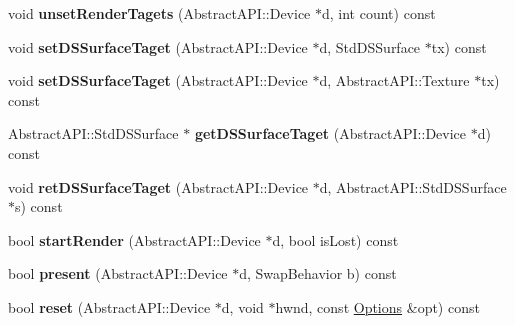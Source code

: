 \begin{DoxyCompactItemize}
\item 
\hypertarget{class_tempest_1_1_opengl2x_a54460147baab85a097a8fe25b6893e40}{void {\bfseries unset\+Render\+Tagets} (Abstract\+A\+P\+I\+::\+Device $\ast$d, int count) const }\label{class_tempest_1_1_opengl2x_a54460147baab85a097a8fe25b6893e40}

\item 
\hypertarget{class_tempest_1_1_opengl2x_a00e95c6c75325d059090ad6fe554dc33}{void {\bfseries set\+D\+S\+Surface\+Taget} (Abstract\+A\+P\+I\+::\+Device $\ast$d, Std\+D\+S\+Surface $\ast$tx) const }\label{class_tempest_1_1_opengl2x_a00e95c6c75325d059090ad6fe554dc33}

\item 
\hypertarget{class_tempest_1_1_opengl2x_a194641f39ced16715135bebfd8cc09fc}{void {\bfseries set\+D\+S\+Surface\+Taget} (Abstract\+A\+P\+I\+::\+Device $\ast$d, Abstract\+A\+P\+I\+::\+Texture $\ast$tx) const }\label{class_tempest_1_1_opengl2x_a194641f39ced16715135bebfd8cc09fc}

\item 
\hypertarget{class_tempest_1_1_opengl2x_a6597bfa5444a239c91764644276c92d8}{Abstract\+A\+P\+I\+::\+Std\+D\+S\+Surface $\ast$ {\bfseries get\+D\+S\+Surface\+Taget} (Abstract\+A\+P\+I\+::\+Device $\ast$d) const }\label{class_tempest_1_1_opengl2x_a6597bfa5444a239c91764644276c92d8}

\item 
\hypertarget{class_tempest_1_1_opengl2x_a5f664d2fe2ef10a548a70b38846e6723}{void {\bfseries ret\+D\+S\+Surface\+Taget} (Abstract\+A\+P\+I\+::\+Device $\ast$d, Abstract\+A\+P\+I\+::\+Std\+D\+S\+Surface $\ast$s) const }\label{class_tempest_1_1_opengl2x_a5f664d2fe2ef10a548a70b38846e6723}

\item 
\hypertarget{class_tempest_1_1_opengl2x_a1b1eda3a8f736df9f281170b6c280738}{bool {\bfseries start\+Render} (Abstract\+A\+P\+I\+::\+Device $\ast$d, bool is\+Lost) const }\label{class_tempest_1_1_opengl2x_a1b1eda3a8f736df9f281170b6c280738}

\item 
\hypertarget{class_tempest_1_1_opengl2x_a3fcfdbd327882af5d6c744307ea0465d}{bool {\bfseries present} (Abstract\+A\+P\+I\+::\+Device $\ast$d, Swap\+Behavior b) const }\label{class_tempest_1_1_opengl2x_a3fcfdbd327882af5d6c744307ea0465d}

\item 
\hypertarget{class_tempest_1_1_opengl2x_aee904b7004535a3153413de4355408da}{bool {\bfseries reset} (Abstract\+A\+P\+I\+::\+Device $\ast$d, void $\ast$hwnd, const \hyperlink{struct_tempest_1_1_abstract_a_p_i_1_1_options}{Options} \&opt) const }\label{class_tempest_1_1_opengl2x_aee904b7004535a3153413de4355408da}


\end{DoxyCompactItemize}
